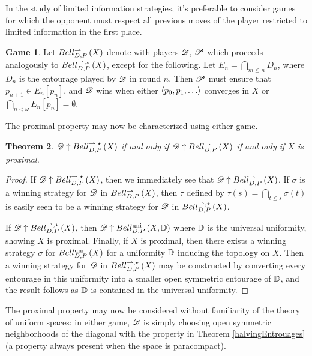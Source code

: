 \documentclass{amsart}
\newtheorem{theorem}{Theorem}[section]
\theoremstyle{definition}
\newtheorem{game}[theorem]{Game}
\begin{document}
  In the study of limited information strategies, it's preferable to
  consider games for which the opponent must respect all previous moves
  of the player restricted to limited information in the first place.

  \begin{game}
    Let \(Bell_{D,P}^{\rightharpoonup}\left({X}\right)\) denote  with players
    \(\mathscr{D}\), \(\mathscr{P}\) which proceeds analogously to \(Bell_{D,P}^{\rightharpoonup,\star}\left({X}\right)\),
    except for the following. Let \(E_n=\bigcap_{m\leq n}D_n\), where \(D_n\) is
    the entourage played by \(\mathscr{D}\) in round \(n\).
    Then \(\mathscr{P}\) must ensure that \(p_{n+1}\in E_n[p_n]\),
    and \(\mathscr{D}\) wins when either \(\<p_0,p_1,\dots\>\) converges in \(X\)
    or \(\bigcap_{n<\omega}E_n[p_n] = \emptyset\).
  \end{game}

  The proximal property may now be characterized using either game.

  \begin{theorem}\label{topologicalProximalGames}
    \(\mathscr{D}\uparrow Bell_{D,P}^{\rightharpoonup,\star}\left({X}\right)\) if and only if
    \(\mathscr{D}\uparrow Bell_{D,P}^{\rightharpoonup}\left({X}\right)\) if and only if
    \(X\) is proximal.
  \end{theorem}

  \begin{proof}
    If \(\mathscr{D}\uparrow Bell_{D,P}^{\rightharpoonup,\star}\left({X}\right)\), then we immediately see that
    \(\mathscr{D}\uparrow Bell_{D,P}^{\rightharpoonup}\left({X}\right)\).
    If \(\sigma\) is a winning strategy for \(\mathscr{D}\)
    in \(Bell_{D,P}^{\rightharpoonup}\left({X}\right)\), then \(\tau\) defined by
    \(\tau(s)=\bigcap_{t\leq s}\sigma(t)\) is easily seen to be a winning
    strategy for \(\mathscr{D}\) in \(Bell_{D,P}^{\rightharpoonup,\star}\left({X}\right)\).

    If \(\mathscr{D}\uparrow Bell_{D,P}^{\rightharpoonup,\star}\left({X}\right)\), then
    \(\mathscr{D}\uparrow Bell_{D,P}^{\textrm{uni}}\left({X,\mathbb{D}}\right)\) where \(\mathbb{D}\) is
    the universal uniformity, showing \(X\) is proximal.
    Finally, if \(X\) is proximal, then there exists a winning strategy
    \(\sigma\) for \(Bell_{D,P}^{\textrm{uni}}\left({X}\right)\) for a uniformity \(\mathbb{D}\) inducing the
    topology on \(X\). Then a winning strategy for \(\mathscr{D}\) in
    \(Bell_{D,P}^{\rightharpoonup,\star}\left({X}\right)\) may be constructed by converting every
    entourage in this uniformity into a smaller open symmetric
    entourage of \(\mathbb{D}\), and the result follows as \(\mathbb{D}\) is
    contained in the universal uniformity.
  \end{proof}

  The proximal property may now be considered without familiarity of
  the theory of uniform spaces: in either game, \(\mathscr{D}\) is simply choosing
  open symmetric neighborhoods of the diagonal with the property in
  Theorem \ref{halvingEntrouages}
  (a property always present when the space is paracompact).
\end{document}

